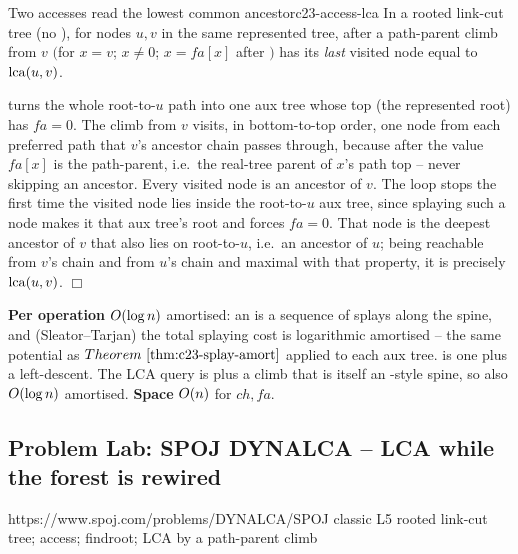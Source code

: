 \begin{theorem}{Two accesses read the lowest common ancestor}{c23-access-lca}
In a rooted link-cut tree (no ), for nodes \(u,v\) in the same
represented tree, after  a path-parent climb from \(v\)
\(\big(\)for \(x{=}v\); \(x\neq 0\); \(x{=}\mathit{fa}[x]\) after \(\big)\)
has its \emph{last} visited node equal to \(\operatorname{lca}(u,v)\).
\end{theorem}
\begin{proofbox}
 turns the whole root-to-\(u\) path into one aux tree whose top
(the represented root) has \(\mathit{fa}=0\). The climb from \(v\) visits, in
bottom-to-top order, one node from each preferred path that \(v\)'s ancestor chain
passes through, because after  the value \(\mathit{fa}[x]\) is the
path-parent, i.e.\ the real-tree parent of \(x\)'s path top -- never skipping an
ancestor. Every visited node is an ancestor of \(v\). The loop stops the first time
the visited node lies inside the root-to-\(u\) aux tree, since splaying such a node
makes it that aux tree's root and forces \(\mathit{fa}=0\). That node is the
deepest ancestor of \(v\) that also lies on root-to-\(u\), i.e.\ an ancestor of
\(u\); being reachable from \(v\)'s chain and from \(u\)'s chain and maximal with
that property, it is precisely \(\operatorname{lca}(u,v)\). \(\Box\)
\end{proofbox}

\begin{complexitybox}
\textbf{Per operation} \(O(\log n)\) amortised: an  is a sequence
of splays along the spine, and (Sleator--Tarjan) the total splaying cost is
logarithmic amortised -- the same potential as \(\thmref{c23-splay-amort}\) applied to
each aux tree.  is one  plus a left-descent. The LCA
query is  plus a climb that is itself an -style spine,
so also \(O(\log n)\) amortised. \textbf{Space} \(O(n)\) for
\(\mathit{ch},\mathit{fa}\).
\end{complexitybox}

\subsection{Problem Lab: SPOJ DYNALCA -- LCA while the forest is rewired}

  {https://www.spoj.com/problems/DYNALCA/}{SPOJ classic L5}
  {rooted link-cut tree; access; findroot; LCA by a path-parent climb}

